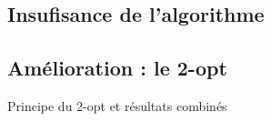 \documentclass[10pt]{beamer}
\begin{document}
	\subsection{Insufisance de l'algorithme}

	\begin{frame}
		
	\end{frame}

	\subsection{Amélioration : le 2-opt}

	\begin{frame}
		Principe du 2-opt et résultats combinés
	\end{frame}
\end{document}
